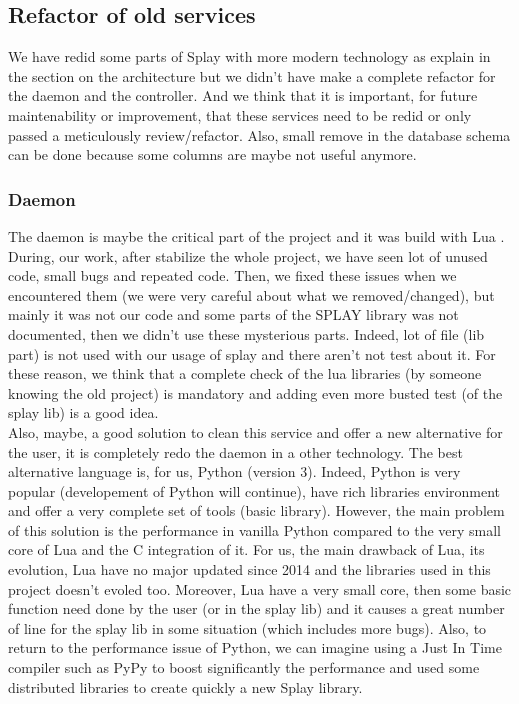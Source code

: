 \documentclass{eplmastersthesis}
\begin{document}
      \subsection{Refactor of old services}
        We have redid some parts of Splay with more modern technology as explain in the section on the architecture but
        we didn't have make a complete refactor for the daemon and the controller. And we think that it is important,
        for future maintenability or improvement, that these services need to be redid or only passed a meticulously review/refactor.
        Also, small remove in the database schema can be done because some columns are maybe not useful anymore.
        
        \subsubsection{Daemon}
          The daemon is maybe the critical part of the project and it was build with Lua \cite{Lua}. During, our work, after
          stabilize the whole project, we have seen lot of unused code, small bugs and repeated code. Then,
          we fixed these issues when we encountered them (we were very careful about what we removed/changed), but
          mainly it was not our code and some parts of the SPLAY library was not documented, then we didn't use these
          mysterious parts. Indeed, lot of file (lib part) is not used with our usage of splay and there aren't not test
          about it. For these reason, we think that a complete check of the lua libraries (by someone knowing the old project) is mandatory
          and adding even more busted test (of the splay lib) is a good idea. \\

          Also, maybe, a good solution to clean this service and offer a new alternative for the user, it is completely
          redo the daemon in a other technology. The best alternative language is, for us, Python (version 3). Indeed, Python is very
          popular (developement of Python will continue), have rich libraries environment and offer a very complete
          set of tools (basic library). However, the main problem of this solution is the performance in vanilla Python compared
          to the very small core of Lua and the C integration of it. For us, the main drawback of Lua, its evolution, Lua have no
          major updated since 2014 and the libraries used in this project doesn't evoled too.
          Moreover, Lua have a very small core, then some basic function need done by the user (or in the splay lib) and
          it causes a great number of line for the splay lib in some situation (which includes more bugs). Also, to return
          to the performance issue of Python, we can imagine using a Just In Time compiler such as PyPy \cite{PyPy} to boost
          significantly the performance and used some distributed libraries to create quickly a new Splay library.
\end{document}
